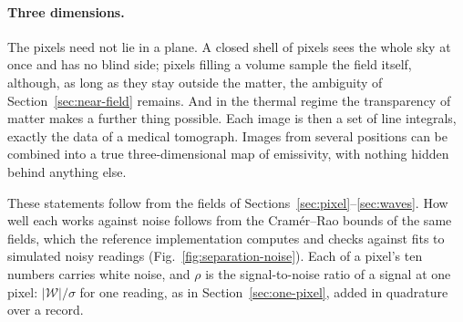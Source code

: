 \paragraph{Three dimensions.} The pixels need not lie in a plane. A closed
shell of pixels sees the whole sky at once and has no blind side; pixels
filling a volume sample the field itself, although, as long as they stay
outside the matter, the ambiguity of Section~\ref{sec:near-field} remains. And in the thermal regime the transparency of matter makes a
further thing possible. Each image is then a set of line integrals, exactly
the data of a medical tomograph. Images from several positions can be combined
into a true three-dimensional map of emissivity, with nothing hidden behind
anything else.

These statements follow from the fields of
Sections~\ref{sec:pixel}--\ref{sec:waves}. How well each works against noise
follows from the Cram\'er--Rao bounds of the same fields, which the reference
implementation computes and checks against fits to simulated noisy readings
(Fig.~\ref{fig:separation-noise}). Each of a pixel's ten numbers carries white
noise, and $\rho$ is the signal-to-noise ratio of a signal at one pixel:
$|\mathcal{W}|/\sigma$ for one reading, as in Section~\ref{sec:one-pixel}, added
in quadrature over a record.

